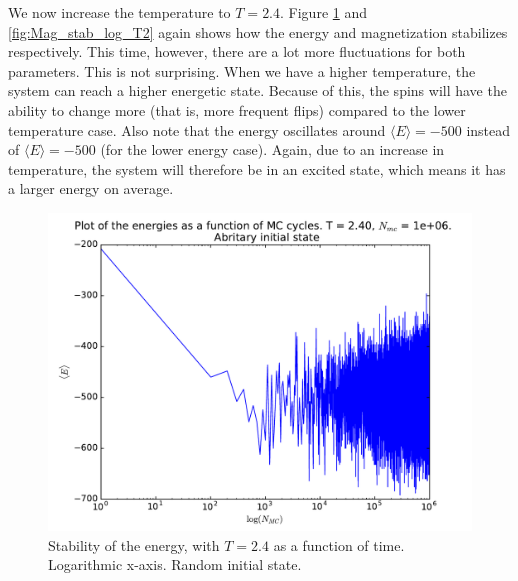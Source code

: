 \documentclass[12pt]{article}
\begin{document}
We now increase the temperature to $T = 2.4$. Figure \ref{fig:Energy_stab_log_T2} and \ref{fig:Mag_stab_log_T2} again shows how the energy and magnetization stabilizes respectively. This time, however, there are a lot more fluctuations for both parameters. This is not surprising. When we have a higher temperature, the system can reach a higher energetic state. Because of this, the spins will have the ability to change more (that is, more frequent flips) compared to the lower temperature case. Also note that the energy oscillates around $\langle E \rangle = -500$ instead of $\langle E \rangle = -500$ (for the lower energy case). Again, due to an increase in temperature, the system will therefore be in an excited state, which means it has a larger energy on average.

\begin{figure}[H]
\centering
\includegraphics[width=\linewidth]{Plots/Energy_stability_logarithmic_T24.pdf}
\caption{Stability of the energy, with $T = 2.4$ as a function of time. Logarithmic x-axis. Random initial state.}
\label{fig:Energy_stab_log_T2}
\end{figure}
\end{document}
